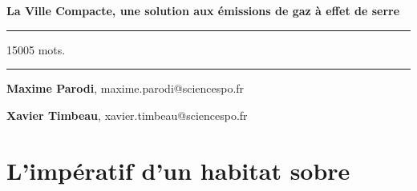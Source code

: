 \documentclass[
  9pt,
  a4paper,
  DIV=11]{scrreprt}
\renewcommand*\contentsname{Table des matières}
\newcommand\contentsname{Table des matières}
\begin{document}
\begin{titlepage}
\newpage
\pagestyle{empty}
\newpage
\pagestyle{empty}
 
\LARGE\textbf{La Ville Compacte, une solution aux émissions de gaz à
effet de serre}

\large\textbf{}

\vspace{1cm}


\par\rule{\textwidth}{0.5pt}

15005 mots.

\par\rule{\textwidth}{0.5pt}


\vspace{1cm}

\begin{flushright}
   \linespread{1}\small{\textbf{Maxime
Parodi}}, {\small{maxime.parodi@sciencespo.fr}}\par
   \linespread{1}\small{\textbf{Xavier
Timbeau}}, {\small{xavier.timbeau@sciencespo.fr}}\par
\end{flushright}
\end{titlepage}
\renewcommand*\contentsname{Table des matières}
{
\hypersetup{linkcolor=}
\setcounter{tocdepth}{0}
\tableofcontents
}
\chapter{L'impératif d'un habitat
sobre}\label{limpuxe9ratif-dun-habitat-sobre}
\end{document}
